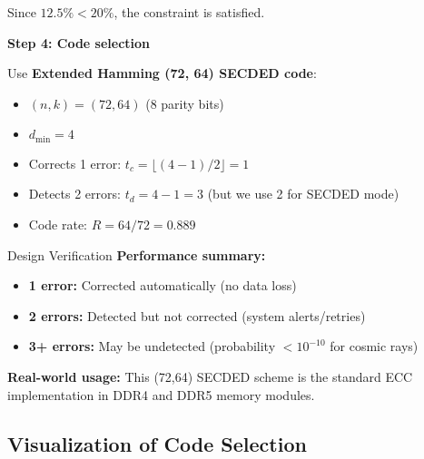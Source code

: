 Since $12.5\% < 20\%$, the constraint is satisfied.

\textbf{Step 4: Code selection}

Use \textbf{Extended Hamming (72, 64) SECDED code}:
\begin{itemize}
\item $(n, k) = (72, 64)$ (8 parity bits)
\item $d_{\min} = 4$
\item Corrects 1 error: $t_c = \lfloor(4-1)/2\rfloor = 1$
\item Detects 2 errors: $t_d = 4 - 1 = 3$ (but we use 2 for SECDED mode)
\item Code rate: $R = 64/72 = 0.889$
\end{itemize}

\begin{calloutbox}{Design Verification}
\textbf{Performance summary:}
\begin{itemize}
\item \textbf{1 error:} Corrected automatically (no data loss)
\item \textbf{2 errors:} Detected but not corrected (system alerts/retries)
\item \textbf{3+ errors:} May be undetected (probability $< 10^{-10}$ for cosmic rays)
\end{itemize}

\textbf{Real-world usage:} This (72,64) SECDED scheme is the standard ECC implementation in DDR4 and DDR5 memory modules.
\end{calloutbox}

\subsection*{Visualization of Code Selection}

